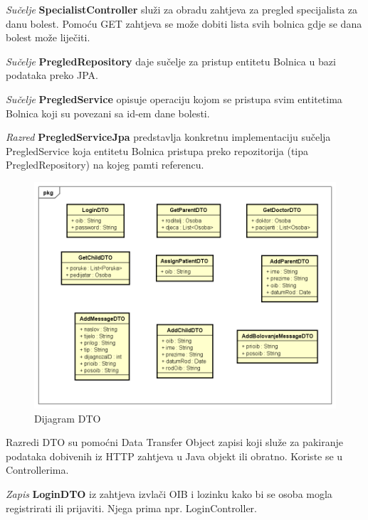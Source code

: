 			  \textit{Sučelje }\textbf{SpecialistController}
			  služi za obradu zahtjeva za pregled specijalista za danu bolest. Pomoću GET zahtjeva se može dobiti lista svih bolnica gdje se dana bolest može liječiti.
			  
			  \textit{Sučelje }\textbf{PregledRepository}
			  daje sučelje za pristup entitetu Bolnica u bazi podataka preko JPA.
			  
			  \textit{Sučelje }\textbf{PregledService}
			  opisuje operaciju kojom se pristupa svim entitetima Bolnica koji su povezani sa id-em dane bolesti.
			  
			  \textit{Razred }\textbf{PregledServiceJpa}
			  predstavlja konkretnu implementaciju sučelja PregledService koja entitetu Bolnica
			  pristupa preko repozitorija (tipa PregledRepository) na kojeg pamti referencu.	 
			
	

			\begin{figure}[H]
				\includegraphics[width=\textwidth]{dijagrami/DijagramDTO.PNG} %
				\caption{Dijagram DTO}
				\label{fig:dijagramdto} %
			\end{figure}
			
			Razredi DTO su pomoćni Data Transfer Object zapisi koji služe za pakiranje podataka dobivenih iz HTTP zahtjeva u Java objekt ili obratno. Koriste se u Controllerima. 
			
			\textit{Zapis }\textbf{LoginDTO} iz zahtjeva izvlači OIB i lozinku kako bi se osoba mogla registrirati ili prijaviti. Njega prima npr. LoginController.
			
